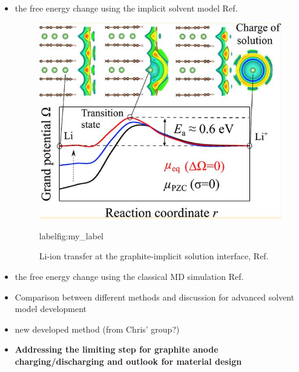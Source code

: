 \documentclass[journal=jacsat,manuscript=article]{achemso}
\begin{document}
\begin{itemize}
    \item the free energy change using the implicit solvent model Ref.
    
    \begin{figure}
        \centering
        \includegraphics[scale=0.75]{figures/graphite-interface.JPG}
        \caption{Li-ion transfer at the graphite-implicit solution interface, Ref.  }
        label{fig:my_label}
    \end{figure}
    
    \item the free energy change using the classical MD  simulation Ref.
    \item Comparison between different methods and discussion for advanced solvent model development
    \item new developed method (from Chris' group?)
    \item \textbf{Addressing the limiting step for graphite anode charging/discharging and outlook for material design}
\end{itemize}
\end{document}
